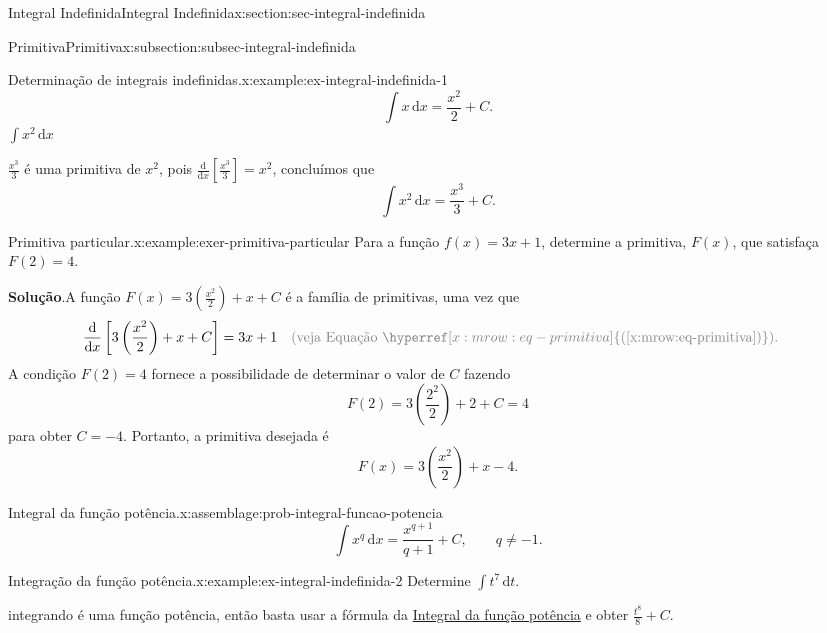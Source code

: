 \documentclass[oneside,10pt,]{article}
\newcommand{\blocktitlefont}{\relax}
\newcommand{\xreffont}{\relax}
\numberwithin{equation}{section}
\newcommand{\dd}{\mathrm{d}}
\newcommand{\integral}[2]{\displaystyle\int {#1}\,\dd {#2}}
\newcommand{\amp}{&}
\begin{document}
\begin{sectionptx}{Integral Indefinida}{}{Integral Indefinida}{}{}{x:section:sec-integral-indefinida}
\begin{subsectionptx}{Primitiva}{}{Primitiva}{}{}{x:subsection:subsec-integral-indefinida}
\begin{example}{Determinação de integrais indefinidas.}{x:example:ex-integral-indefinida-1}
\begin{equation*}
\integral{x}{x}=\frac{x^2}{2} + C\text{.}
\end{equation*}
%
 \(\integral{x^2}{x}\)%
\par\smallskip%
\noindentComo \(\frac{x^3}{3}\) é uma primitiva de \(x^2\), pois \(\frac{\dd}{\dd x}[\frac{x^3}{3}]=x^2\), concluímos que%
\begin{equation*}
\integral{x^2}{x}=\frac{x^3}{3} +C\text{.}
\end{equation*}
%
%
\end{example}
\begin{example}{Primitiva particular.}{x:example:exer-primitiva-particular}%
Para a função \(f(x)=3x+1\), determine a primitiva, \(F(x)\), que satisfaça \(F(2)=4\).%
\par\smallskip%
\noindent\textbf{\blocktitlefont Solução}.\hypertarget{g:solution:idp11}{}\quad{}A função \(F(x)= 3\left(\frac{x^2}{2}\right) + x+ C\) é a família de primitivas, uma vez que%
\begin{align*}
\frac{\dd }{\dd x}\left[3\left(\frac{x^2}{2}\right) + x+ C\right]= 3x+1 \amp \quad \color{gray}{(\text{veja Equação} \,\,  \hyperref[x:mrow:eq-primitiva]{\text{({\xreffont\ref{x:mrow:eq-primitiva}})}})}\text{.}
\end{align*}
A condição \(F(2)=4\) fornece a possibilidade de determinar o valor de \(C\) fazendo%
\begin{equation*}
F(2)=   3\left(\frac{2^2}{2}\right) + 2 + C = 4
\end{equation*}
para obter \(C=-4\). Portanto, a primitiva desejada é%
\begin{equation*}
F(x)= 3\left(\frac{x^2}{2}\right) + x - 4\text{.}
\end{equation*}
%
\end{example}
\begin{assemblage}{Integral da função potência.}{x:assemblage:prob-integral-funcao-potencia}%
%
\begin{equation*}
\integral{x^q}{x} = \frac{x^{q+1}}{q+1} + C, \qquad q\neq - 1.
\end{equation*}
%
\end{assemblage}
\begin{example}{Integração da função potência.}{x:example:ex-integral-indefinida-2}%
Determine \(\integral{t^7}{t}\).%
\par\smallskip%
\noindentO integrando é uma função potência, então basta usar a fórmula da \hyperref[x:assemblage:prob-integral-funcao-potencia]{Integral da função potência} e obter \(\frac{t^8}{8} + C\).%

\end{example}
\end{subsectionptx}
\end{sectionptx}
\end{document}

